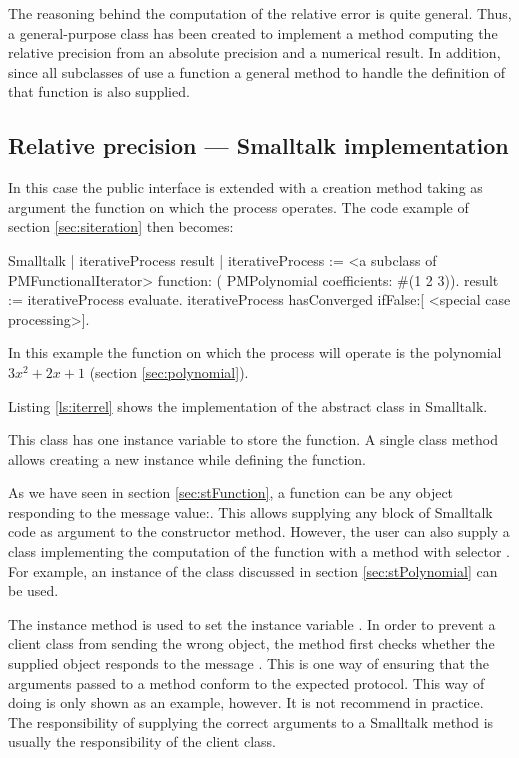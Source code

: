 The reasoning behind the computation of the relative error is
quite general. Thus, a general-purpose class  has been created to implement a method
computing the relative precision from an absolute precision and a
numerical result. In addition, since all subclasses of  use a function a general method to handle the
definition of that function is also supplied.

\subsection{Relative precision --- Smalltalk  implementation}
\label{sec:siterrel} In this case the public interface is extended
with a creation method taking as argument the function on which
the process operates.
The code example of section \ref{sec:siteration} then becomes:
\begin{displaycode}{Smalltalk}
| iterativeProcess result |
iterativeProcess := <a subclass of PMFunctionalIterator>
                  function: ( PMPolynomial coefficients: #(1 2 3)).
result := iterativeProcess evaluate.
iterativeProcess hasConverged ifFalse:[ <special case processing>].
\end{displaycode}
In this example the function on which the process will operate is
the polynomial $3x^2+2x+1$ (\cf section \ref{sec:polynomial}).

Listing \ref{ls:iterrel} shows the implementation of the abstract
class  in Smalltalk.

This class has one instance variable  to store
the function. A single class method allows creating a new instance
while defining the function.

As we have seen in section \ref{sec:stFunction}, a function can be
any object responding to the message value:. This allows supplying
any block of Smalltalk code as argument to the constructor method.
However, the user can also supply a class implementing the
computation of the function with a method with selector . For example, an instance of the class 
discussed in section \ref{sec:stPolynomial} can be used.

The instance method  is used to set the instance
variable . In order to prevent a client class
from sending the wrong object, the method first checks whether the
supplied object responds to the message . This is one
way of ensuring that the arguments passed to a method conform to
the expected protocol. This way of doing is only shown as an
example, however. It is not recommend in practice. The
responsibility of supplying the correct arguments to a Smalltalk
method is usually the responsibility of the client class.

